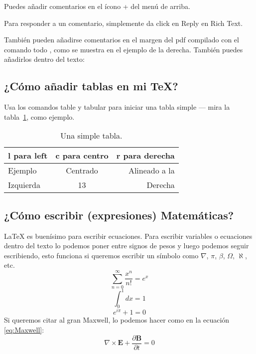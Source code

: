 \documentclass[a4paper]{article}
\begin{document}
Puedes añadir comentarios en el ícono + del menú de arriba.

Para responder a un comentario, simplemente da click en Reply en Rich Text.

También pueden añadirse comentarios en el margen del pdf compilado con el comando todo , como se muestra en el ejemplo de la derecha. También puedes añadirlos dentro del texto:


\subsection{¿Cómo añadir tablas en mi \TeX?}

Usa los comandos table y tabular para iniciar una tabla simple --- mira la tabla~\ref{tab:tabla ejemplo}, como ejemplo. 

\begin{table}
\centering
\begin{tabular}{l c r} 
l para left & c para centro & r para derecha \\ \hline
Ejemplo & Centrado & Alineado a la\\
Izquierda & 13 & Derecha
\end{tabular}
\caption{\label{tab:tabla ejemplo}Una simple tabla.}
\end{table}

\subsection{¿Cómo escribir (expresiones) Matemáticas?}

\LaTeX{} es buenísimo para escribir ecuaciones. Para escribir variables o ecuaciones dentro del texto lo podemos poner entre signos de pesos y luego podemos seguir escribiendo, esto funciona si queremos escribir un símbolo como $\nabla$, $\pi$, $\beta$, $\Omega$, $\aleph$, etc.
\begin{equation}
\sum_{n=0}^\infty \frac{x^n}{n!}=e^x
\end{equation}
\begin{equation}
\int_{0}^{1}dx=1
\end{equation}
\begin{equation}
e^{i\pi}+1=0
\end{equation}
Si queremos citar al gran Maxwell, lo podemos hacer como en la ecuación \ref{eq:Maxwell}:
\begin{equation}
\nabla\times\mathbf{E}+\frac{\partial\mathbf{B}}{\partial t}=0\label{eq:Maxwell}
\end{equation}
\end{document}
